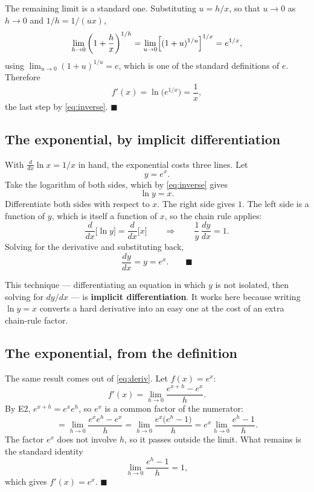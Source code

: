 \documentclass[11pt]{article}
\theoremstyle{plain}
\theoremstyle{definition}
\theoremstyle{remark}
\newcommand{\dd}[2]{\frac{d #1}{d #2}}
\begin{document}
The remaining limit is a standard one. Substituting $u=h/x$, so that $u\to0$ as
$h\to0$ and $1/h=1/(ux)$,
\[
  \lim_{h\to0}\left(1+\frac{h}{x}\right)^{1/h}
  =\lim_{u\to0}\Bigl[(1+u)^{1/u}\Bigr]^{1/x}
  = e^{1/x},
\]
using $\lim_{u\to0}(1+u)^{1/u}=e$, which is one of the standard definitions of
$e$. Therefore
\[
  f'(x)=\ln\bigl(e^{1/x}\bigr)=\frac{1}{x},
\]
the last step by \eqref{eq:inverse}. \qquad$\blacksquare$

\subsection{The exponential, by implicit differentiation}
With $\tfrac{d}{dx}\ln x=1/x$ in hand, the exponential costs three lines. Let
\[
  y=e^{x} .
\]
Take the logarithm of both sides, which by \eqref{eq:inverse} gives
\[
  \ln y = x .
\]
Differentiate both sides with respect to $x$. The right side gives $1$. The left
side is a function of $y$, which is itself a function of $x$, so the chain rule
applies:
\[
  \frac{d}{dx}\bigl[\ln y\bigr] = \frac{d}{dx}\bigl[x\bigr]
  \qquad\Longrightarrow\qquad
  \frac{1}{y}\,\dd{y}{x} = 1 .
\]
Solving for the derivative and substituting back,
\[
  \dd{y}{x} = y = e^{x} . \qquad\blacksquare
\]

\noindent This technique --- differentiating an equation in which $y$ is not
isolated, then solving for $dy/dx$ --- is \textbf{implicit differentiation}. It
works here because writing $\ln y=x$ converts a hard derivative into an easy
one at the cost of an extra chain-rule factor.

\subsection{The exponential, from the definition}
The same result comes out of \eqref{eq:deriv}. Let $f(x)=e^{x}$:
\[
  f'(x)=\lim_{h\to0}\frac{e^{x+h}-e^{x}}{h} .
\]
By E2, $e^{x+h}=e^{x}e^{h}$, so $e^{x}$ is a common factor of the numerator:
\[
  =\lim_{h\to0}\frac{e^{x}e^{h}-e^{x}}{h}
  =\lim_{h\to0}\frac{e^{x}\bigl(e^{h}-1\bigr)}{h}
  = e^{x}\lim_{h\to0}\frac{e^{h}-1}{h} .
\]
The factor $e^{x}$ does not involve $h$, so it passes outside the limit. What
remains is the standard identity
\begin{equation}\label{eq:explimit}
  \lim_{h\to0}\frac{e^{h}-1}{h} = 1,
\end{equation}
which gives $f'(x)=e^{x}$. \qquad$\blacksquare$
\end{document}
